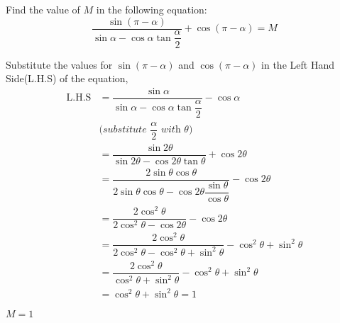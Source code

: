 

\question[4] Find the value of $M$ in the following equation:
\[\dfrac{\sin(\pi - \alpha)}{\sin\alpha - 
  \cos\alpha\tan\dfrac{\alpha}{2}} + \cos(\pi - \alpha) = M \nonumber\]


\begin{solution}[\halfpage]
  Substitute the values for $\sin(\pi - \alpha)$ and $\cos(\pi - \alpha)$ 
  in the Left Hand Side(L.H.S) of the equation,
  \begin{align}
    \text{L.H.S} &= \dfrac{\sin\alpha}{\sin\alpha -
    				  \cos\alpha\tan\dfrac{\alpha}{2}}
					  - \cos\alpha \\
    &\textit{(substitute $\dfrac{\alpha}{2}$ with $\theta$)} \nonumber \\
				 &= \dfrac{\sin 2\theta}{\sin 2\theta - 
				 	  \cos 2\theta\tan\theta} + \cos 2\theta \\	
				 &= \dfrac{2\sin\theta\cos\theta}{2\sin\theta\cos\theta - 
				 	  \cos 2\theta\dfrac{\sin\theta}{\cos\theta}} 
				 	  - \cos 2\theta \\
				 &= \dfrac{2\cos ^2\theta}{2\cos^2\theta - 
				 	  \cos 2\theta} - \cos 2\theta \\
				 &= \dfrac{2\cos ^2\theta}{2\cos^2\theta - 
				 	  \cos^2\theta + \sin^2\theta} - \cos^2\theta + \sin^2\theta \\
				 &= \dfrac{2\cos^2\theta}{\cos^2\theta + \sin^2\theta} -
				 	  \cos^2\theta + \sin^2\theta \\
				 &= \cos^2\theta + \sin^2\theta = 1
  \end{align}
\end{solution}
\ifprintanswers\begin{codex}$M=1$\end{codex}\fi
